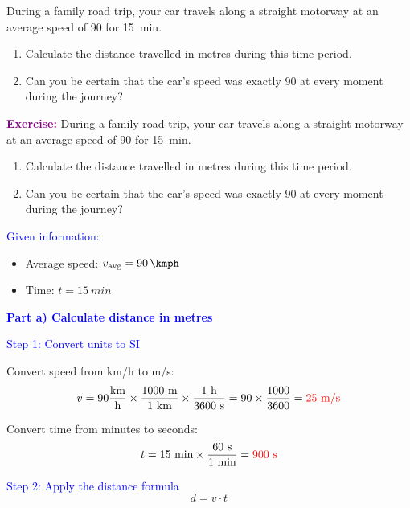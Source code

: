 \begin{exercise}
    During a family road trip, your car travels along a straight motorway at an average speed of \qty{90}{\kmph} for \qty{15}{min}.
    \begin{enumerate}[label=\letraminuscula]
        \item Calculate the distance travelled in metres during this time period.
        \item Can you be certain that the car's speed was exactly \qty{90}{\kmph} at every moment during the journey?
    \end{enumerate}
    \begin{solu}
        \textbf{\textcolor{purple}{Exercise:}} During a family road trip, your car travels along a straight motorway at an average speed of \qty{90}{\kmph} for \qty{15}{min}.
        \begin{enumerate}[label=\letraminuscula]
            \item Calculate the distance travelled in metres during this time period.
            \item Can you be certain that the car's speed was exactly \qty{90}{\kmph} at every moment during the journey?
        \end{enumerate}

        \vspace{0.3cm}

        \textcolor{blue}{Given information:}
        \begin{itemize}
            \item Average speed: $v_{\text{avg}} = \qty{90}{\kmph}$
            \item Time: $t = \qty{15}{min}$
        \end{itemize}

        \textbf{\textcolor{blue}{Part a) Calculate distance in metres}}

        \textcolor{blue}{Step 1: Convert units to SI}

        Convert speed from km/h to m/s:
        \[
            v = 90 \frac{\text{km}}{\text{h}} \times \frac{1000 \text{ m}}{1 \text{ km}} \times \frac{1 \text{ h}}{3600 \text{ s}} = 90 \times \frac{1000}{3600} = \textcolor{red}{25 \text{ m/s}}
        \]

        Convert time from minutes to seconds:
        \[
            t = 15 \text{ min} \times \frac{60 \text{ s}}{1 \text{ min}} = \textcolor{red}{900 \text{ s}}
        \]

        \textcolor{blue}{Step 2: Apply the distance formula}
        \[
            \boxed{d = v \cdot t}
        \]


\end{solu}
\end{exercise}
